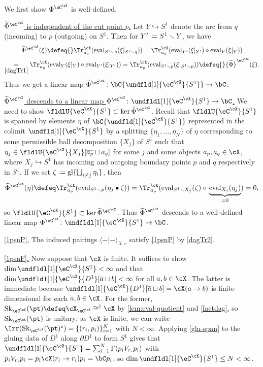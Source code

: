 \documentclass[12pt,reqno]{amsart}
\newcommand{\glu}{\mathrm{gl}}
\newcommand{\Sk}{\mathrm{Sk}}
\newcommand{\eval}{\mathrm{eval}}
\newcommand{\psn}{\Phi}
\newcommand{\C}{\eC}
\newcommand{\blt}{\bullet}
\newcommand{\tld}[1]{{\widetilde{#1}}}
\newcommand{\fcj}[1]{\overline{#1}}
\newcommand{\bkt}[2]{\langle #1|#2 \rangle}
\newcommand{\cent}{\textup{\textcent}}
\newcommand{\itemstep}[1]{\smallskip\noindent\underline{#1}}
\renewcommand{\setminus}{\smallsetminus}
\renewcommand{\amalg}{\sqcup}
\DeclareRobustCommand{\coloneq}{\mathrel{\vcenter{\baselineskip0.5ex\lineskiplimit0pt\hbox{\scriptsize{\upshape.}}\hbox{\scriptsize{\upshape.}}}}=}
\begin{document}
\begin{pf}
We first show $\psn^{\eC^\cX}$ is well-defined.

\itemstep{$\tld\psn^{\C^\cX}$ is independent of the cut point $p$.}
Let $Y\hookrightarrow S^1$ denote the arc from $q$ (incoming) to $p$ (outgoing) on $S^1$. Then for $Y'\coloneq S^1\setminus Y$, we have
\begin{multline*}
  \tld{\psn}^{\C^\cX}(\xi)
  \defeq{}\Tr^\cX_{a_q}(\eval_{S^1\setminus q}(\xi|_{S^1\setminus q}))
  =\Tr^\cX_{a_q}(\eval_{Y'}(\xi|_{Y'})\circ\eval_{Y}(\xi|_{Y}))
  \\
  \underset{\ref{dagTr1}}{=}\Tr^\cX_{a_p}(\eval_{Y}(\xi|_{Y})\circ\eval_{Y'}(\xi|_{Y'}))
  =\Tr^\cX_{a_p}(\eval_{S^1\setminus p}(\xi|_{S^1\setminus p}))
  \defeq{}\tld{\psn}^{\C^\cX}(\xi).
\end{multline*}
Thus we get a linear map $\tld{\psn}^{\C^\cX}\colon\bC\{\undfld[1]{\C^\cX}{S^1}\}\to\bC$.

\itemstep{$\tld{\psn}^{\C^\cX}$ descends to a linear map $\psn^{\C^\cX}\colon\undfldl[1]{\C^\cX}{S^1}\to\bC$.}
We need to show $\fldlU{\C^\cX}{S^1}\subset\ker\tld{\psn}^{\C^\cX}$. Recall that $\fldlU{\C^\cX}{S^1}$ is spanned by elements $\eta$ of $\bC\{\undfld[1]{\C^\cX}{S^1}\}$
represented in the colimit $\undfld[1]{\C^\cX}{S^1}$ by a splitting $\{\eta_1,\dots,\eta_N\}$
of $\eta$ corresponding to some permissible ball decomposition $\{X_j\}$ of $S^1$ such that
$\eta_j\in\fldlU{\C^\cX}{X_j}[\fcj{a_p}\amalg a_q]$ for some $j$ and some objects $a_p,a_q\in\cX$,
where $X_j\hookrightarrow S^1$ has incoming and outgoing boundary points $p$ and $q$
respectively in $S^1$. If we set $\zeta\coloneq\glu\{\textstyle\bigcup_{i\neq j}\eta_i\}$, then
\[
  \tld{\psn}^{\C^\cX}(\eta)
  \defeq\Tr^\cX_{a_p}(\eval_{S^1\setminus p}(\eta_j\blt\zeta))
  =\Tr_{a_p}^\cX(\eval_{S^1\setminus X_j}(\zeta)\circ\,\underbrace{\eval_{X_j}(\eta_j)}_{=0})
  =0,
\]
so $\fldlU{\C^\cX}{S^1}\subset\ker\tld{\psn}^{\C^\cX}$. Thus $\tld{\psn}^{\C^\cX}$ descends to a well-defined linear map $\psn^{\C^\cX}\colon\undfldl[1]{\C^\cX}{S^1}\to\bC$.

\itemstep{\ref{1psnP}.}
The induced pairings $\bkt{ - }{ - }_{X,c}$ satisfy \ref{1psnP} by \ref{dagTr2}.

\itemstep{\ref{1psnF}.} 
Now suppose that $\cX$ is finite.
  It suffices to show $\dim\undfldl[1]{\C^\cX}{S^1}<\infty$ and that $\dim\undfldl[1]{\C^\cX}{D^1}[\fcj{a}\amalg b]<\infty$ for all $a,b\in\cX$. 
  The latter is immediate because $\undfldl[1]{\C^\cX}{D^1}[\fcj{a}\amalg b]=\cX(a\to b)$ is finite-dimensional for each $a,b\in\cX$. 
  For the former, $\Sk_{\C^\cX}(\pt)\defeq\cX_{\C^\cX}\cong^\dag\cX$ by
  \cref{lem:eval-quotient} and \cref{factdag}, so $\Sk_{\C^\cX}(\pt)$ is unitary; as $\cX$ is finite, we can write $\Irr(\Sk_{\C^\cX}(\pt)^\cent)=\{(r_i,p_i)\}_{i=1}^N$ with $N<\infty$. Applying \cref{glu-span}
  to the gluing data of $D^1$ along $\partial D^1$ to form $S^1$ gives that $\undfldl[1]{\C^\cX}{S^1}=\sum_{i=1}^N\Gamma(p_iV_{r_i}p_i)$ with $p_iV_{r_i}p_i=p_i\cX(r_i\to r_i)p_i=\bC p_i$, so $\dim\undfldl[1]{\C^\cX}{S^1}\leq N<\infty$. 
\end{pf}
\end{document}
